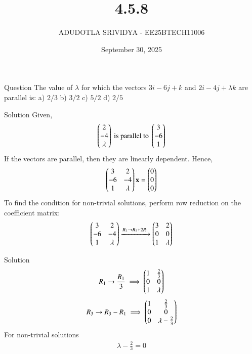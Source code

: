 \documentclass{beamer}
\title{4.5.8}
\date{September 30, 2025}
\author{ADUDOTLA SRIVIDYA - EE25BTECH11006}
\begin{document}
\frame{\titlepage}

\begin{frame}{Question}
The value of $\lambda$ for which the vectors $3i-6j+k$ and $2i-4j+\lambda k$ are parallel is:  
a) $2/3$ \quad b) $3/2$ \quad c) $5/2$ \quad d) $2/5$
\end{frame}


\begin{frame}{Solution}
Given,
\begin{align}
    \begin{pmatrix}2\\-4\\ \lambda\end{pmatrix} \text{ is parallel to } \begin{pmatrix}3\\-6\\1\end{pmatrix}
\end{align}
If the vectors are parallel, then they are linearly dependent. Hence,
\begin{align}
    \begin{pmatrix}3 & 2 \\ -6 & -4 \\ 1 & \lambda\end{pmatrix}\mathbf{x} = \begin{pmatrix}0 \\ 0 \\ 0\end{pmatrix}
\end{align}
To find the condition for non-trivial solutions, perform row reduction on the coefficient matrix:
\begin{align}
\begin{pmatrix}3 & 2 \\-6 & -4 \\1 & \lambda\end{pmatrix}
\xrightarrow{R_2 \rightarrow R_2 + 2R_1}
\begin{pmatrix}3 & 2 \\0 & 0 \\1 & \lambda\end{pmatrix}
\end{align}
\end{frame}

\begin{frame}{Solution}
    \begin{align}
R_1 \rightarrow \frac{R_1}{3} \implies
\begin{pmatrix}1 & \frac{2}{3} \\0 & 0 \\1 & \lambda\end{pmatrix}
\end{align}
\begin{align}
R_3 \rightarrow R_3 - R_1 \implies
\begin{pmatrix}1 & \frac{2}{3} \\0 & 0 \\0 & \lambda - \frac{2}{3}\end{pmatrix}
\end{align}
For non-trivial solutions
\begin{align}
    \lambda - \frac{2}{3} = 0
\end{align}
\end{frame}
\end{document}
